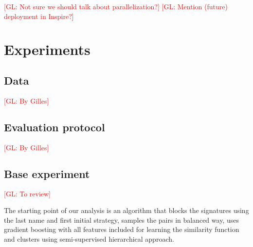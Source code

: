 \documentclass{article}
\newcommand{\glnote}[1]{\textcolor{red}{[GL: #1]}}
\begin{document}
\glnote{Not sure we should talk about parallelization?}
\glnote{Mention (future) deployment in Inspire?}




\section{Experiments}
\label{experiments}

\subsection{Data}

\glnote{By Gilles}


\subsection{Evaluation protocol}

\glnote{By Gilles}


\subsection{Base experiment}

\glnote{To review}

The starting point of our analysis is an algorithm that blocks the signatures using the last
name and first initial strategy, samples the pairs in balanced way, uses gradient boosting
with all features included for learning the similarity function and clusters using
semi-supervised hierarchical approach.
\end{document}
